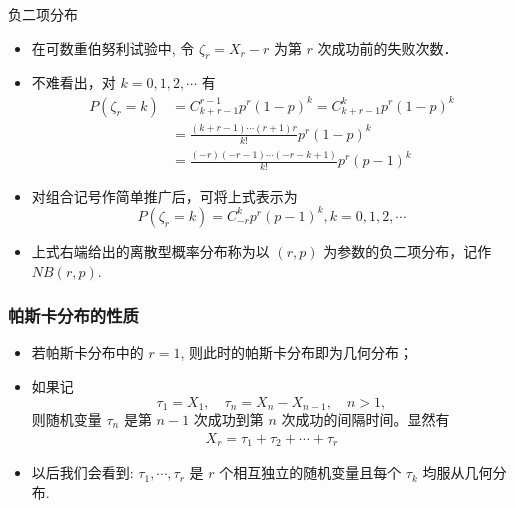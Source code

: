 \documentclass[Prob-All.tex]{subfiles}
\begin{document}
\begin{frame}{负二项分布}
\begin{itemize}[<+-|alert@+>]
\item  在可数重伯努利试验中, 令 $\zeta_{r}=X_{r}-r$ 为第 $r$ 次成功前的失败次数．
\item 不难看出，对 $k=0,1,2, \cdots$ 有
\begin{align*}
P\left(\zeta_{r}=k\right)  &=C_{k+r-1}^{r-1} p^{r}(1-p)^{k}=C_{k+r-1}^{k} p^{r}(1-p)^{k} \\
&=\frac{(k+r-1) \cdots(r+1) r}{k!} p^{r}(1-p)^{k} \\
&=\frac{(-r)(-r-1) \cdots(-r-k+1)}{k!} p^{r}(p-1)^{k}
\end{align*}
\item 对组合记号作简单推广后，可将上式表示为
\[
P\left(\zeta_{r}=k\right)=C_{-r}^{k} p^{r}(p-1)^{k},  k=0,1,2, \cdots
\]
\item 上式右端给出的离散型概率分布称为以 $(r, p)$ 为参数的负二项分布，记作 $NB(r, p)$.
\end{itemize}





\end{frame}

\begin{frame}
	\frametitle{帕斯卡分布的性质}
	\begin{itemize}[<+-|alert@+>]
		\item 若帕斯卡分布中的 $r=1$, 则此时的帕斯卡分布即为几何分布；
		\item 如果记 $$\tau_1=X_1, \quad \tau_n=X_n-X_{n-1}, \quad n>1, $$ 则随机变量 $\tau_n$ 是第 $n-1$ 次成功到第 $n$ 次成功的间隔时间。显然有
		      \begin{eqnarray*}
			      X_r=\tau_1+\tau_2+\cdots+\tau_r
		      \end{eqnarray*}
		\item 以后我们会看到: $\tau_1,\cdots, \tau_r$ 是 $r$ 个相互独立的随机变量且每个 $\tau_k$ 均服从几何分布.
	\end{itemize}
\end{frame}
\end{document}
